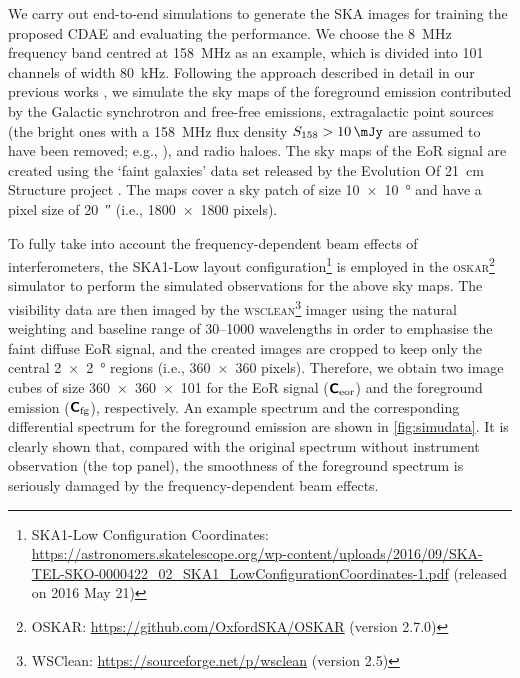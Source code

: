\documentclass[letters,a4paper,fleqn,usenatbib]{mnras}
\newcommand{\R}[1]{\mathrm{#1}}
\newcommand{\M}[1]{\mathbfss{#1}}
\begin{document}
We carry out end-to-end simulations to generate the SKA images for
training the proposed CDAE and evaluating the performance.
We choose the \SI{8}{\MHz} frequency band centred at \SI{158}{\MHz} as
an example, which is divided into 101 channels of width \SI{80}{\kHz}.
Following the approach described in detail in our previous works
\citep{wang2010,wang2013}, we simulate the sky maps of the foreground
emission contributed by the Galactic synchrotron and free-free
emissions, extragalactic point sources (the bright ones with a
\SI{158}{\MHz} flux density $S_{158} > \SI{10}{\mJy}$ are assumed to
have been removed; e.g., \citealt{liu2009ps}), and radio haloes.
The sky maps of the EoR signal are created using the `faint galaxies'
data set released by the Evolution Of 21~cm Structure project
\citep{mesinger2016}.
The maps cover a sky patch of size \SI{10 x 10}{\degree} and have
a pixel size of \SI{20}{\arcsecond} (i.e., \num{1800 x 1800} pixels).

To fully take into account the frequency-dependent beam effects of
interferometers, the SKA1-Low layout configuration\footnote{%
  SKA1-Low Configuration Coordinates:
  \url{https://astronomers.skatelescope.org/wp-content/uploads/2016/09/SKA-TEL-SKO-0000422_02_SKA1_LowConfigurationCoordinates-1.pdf}
  (released on 2016 May 21)}
is employed in the \textsc{oskar}\footnote{%
  OSKAR: \url{https://github.com/OxfordSKA/OSKAR} (version 2.7.0)}
simulator \citep{mort2010} to perform the simulated observations for the
above sky maps.
The visibility data are then imaged by the \textsc{wsclean}\footnote{%
  WSClean: \url{https://sourceforge.net/p/wsclean} (version 2.5)}
imager \citep{offringa2014} using the natural weighting and baseline
range of \numrange{30}{1000} wavelengths in order to emphasise the
faint diffuse EoR signal, and the created images are cropped to keep
only the central \SI{2 x 2}{\degree} regions (i.e., \num{360 x 360}
pixels).
Therefore, we obtain two image cubes of size \num{360 x 360 x 101}
for the EoR signal ($\M{C}_{\R{eor}}$) and the foreground emission
($\M{C}_{\R{fg}}$), respectively.
An example spectrum and the corresponding differential spectrum for
the foreground emission are shown in \autoref{fig:simudata}.
It is clearly shown that, compared with the original spectrum without
instrument observation (the top panel), the smoothness of the foreground
spectrum is seriously damaged by the frequency-dependent beam effects.
\end{document}
